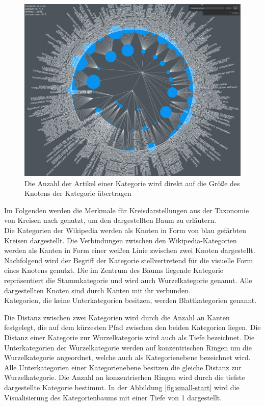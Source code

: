 \begin{figure}[H]
    \centering
    \includegraphics[width=\textwidth]{images/cat-size-direct}
    \caption{Die Anzahl der Artikel einer Kategorie wird direkt auf die Größe des Knotens der Kategorie übertragen}
    \label{fig:cat-size-direct}
\end{figure}


Im Folgenden werden die Merkmale für Kreisdarstellungen aus der Taxonomie von Kreisen nach \cite[S.~57]{lima2017circle} genutzt, um den dargestellten Baum zu erläutern.\\
Die Kategorien der Wikipedia werden als Knoten in Form von blau gefärbten Kreisen dargestellt.
Die Verbindungen zwischen den Wikipedia-Kategorien werden als Kanten in Form einer weißen Linie zwischen zwei Knoten dargestellt.
Nachfolgend wird der Begriff der Kategorie stellvertretend für die visuelle Form eines Knotens genutzt.
Die im Zentrum des Baums liegende Kategorie repräsentiert die Stammkategorie und wird auch Wurzelkategorie genannt.
Alle dargestellten Knoten sind durch Kanten mit ihr verbunden.\\
Kategorien, die keine Unterkategorien besitzen, werden Blattkategorien genannt.

Die Distanz zwischen zwei Kategorien wird durch die Anzahl an Kanten festgelegt, die auf dem kürzesten Pfad zwischen den beiden Kategorien liegen.
Die Distanz einer Kategorie zur Wurzelkategorie wird auch als Tiefe bezeichnet.
Die Unterkategorien der Wurzelkategorie werden auf konzentrischen Ringen um die Wurzelkategorie angeordnet, welche auch als Kategorienebene bezeichnet wird.
Alle Unterkategorien einer Kategorienebene besitzen die gleiche Distanz zur Wurzelkategorie.
Die Anzahl an konzentrischen Ringen wird durch die tiefste dargestellte Kategorie bestimmt.
In der Abbildung \ref{fig:small-start} wird die Visualisierung des Kategorienbaums mit einer Tiefe von 1 dargestellt.

